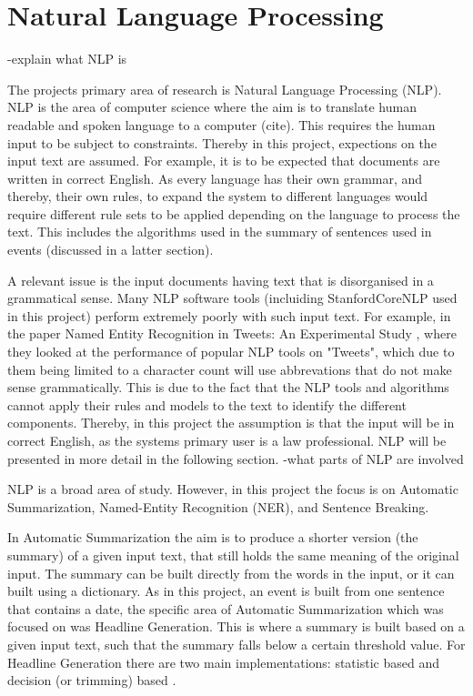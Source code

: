 \section{Natural Language Processing}
-explain what NLP is
\par The projects primary area of research is Natural Language Processing (NLP). NLP is the area of computer science where the aim is to translate human readable and spoken language to a computer (cite). This requires the human input to be subject to constraints. Thereby in this project, expections on the input text are assumed. For example, it is to be expected that documents are written in correct English. As every language has their own grammar, and thereby, their own rules, to expand the system to different languages would require different rule sets to be applied depending on the language to process the text. This includes the algorithms used in the summary of sentences used in events (discussed in a latter section).
\par A relevant issue is the input documents having text that is disorganised in a grammatical sense. Many NLP software tools (incluiding StanfordCoreNLP used in this project) perform extremely poorly with such input text. For example, in the paper Named Entity Recognition in Tweets: An Experimental Study \cite{ritter2011}, where they looked at the performance of popular NLP tools on "Tweets", which due to them being limited to a character count will use abbrevations that do not make sense grammatically. This is due to the fact that the NLP tools and algorithms cannot apply their rules and models to the text to identify the different components. Thereby, in this project the assumption is that the input will be in correct English, as the systems primary user is a law professional. NLP will be presented in more detail in the following section.
-what parts of NLP are involved
\par NLP is a broad area of study. However, in this project the focus is on Automatic Summarization, Named-Entity Recognition (NER), and Sentence Breaking.
\par In Automatic Summarization the aim is to produce a shorter version (the summary) of a given input text, that still holds the same meaning of the original input. The summary can be built directly from the words in the input, or it can built using a dictionary. As in this project, an event is built from one sentence that contains a date, the specific area of Automatic Summarization which was focused on was Headline Generation. This is where a summary is built based on a given input text, such that the summary falls below a certain threshold value. For Headline Generation there are two main implementations: statistic based and decision (or trimming) based \cite{daumemarcu2002}.

